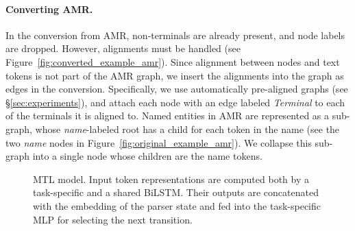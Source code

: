 \documentclass[11pt,a4paper]{article}
\begin{document}
\paragraph{Converting AMR.}
In the conversion from AMR, non-terminals are already present, and node labels are dropped.
However, alignments must be handled (see Figure~\ref{fig:converted_example_amr}).
Since alignment between nodes and text tokens is not part of the AMR graph,
we insert the alignments into the graph as edges in the conversion.
Specifically, we use automatically pre-aligned graphs (see \S\ref{sec:experiments}),
and attach each node with an edge labeled \textit{Terminal} to each of the terminals it is aligned to.
%
Named entities in AMR are represented as a sub-graph, whose \textit{name}-labeled root
has a child for each token in the name (see the two \textit{name} nodes in Figure~\ref{fig:original_example_amr}).
We collapse this sub-graph into a single node whose children are the name tokens.


\begin{figure}[t]
   \caption{MTL model.
      Input token representations are computed both by a task-specific and a shared BiLSTM.
      Their outputs are concatenated with the embedding of the parser state and fed into the task-specific MLP for selecting the next transition.}
   \label{fig:multi_model}
\end{figure}
\end{document}
